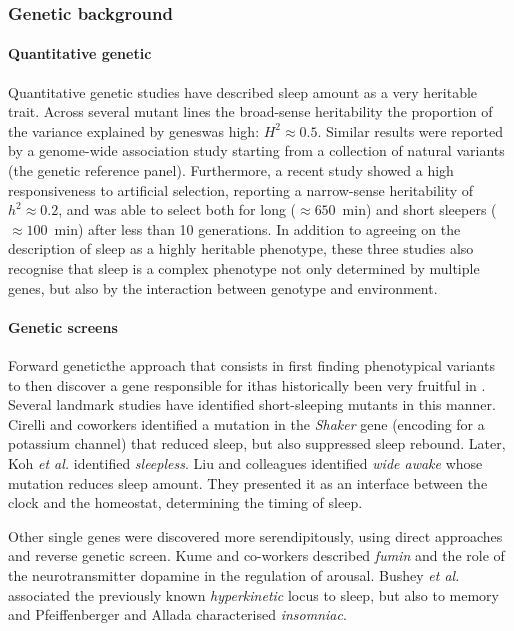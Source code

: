 \subsubsection{Genetic background}

\paragraph*{Quantitative genetic} Quantitative genetic studies have described sleep amount as a very heritable trait.
Across several mutant lines the broad-sense heritability\emd{}\ie{} the proportion of the variance explained by genes\emd{}was high: $H^2 \approx 0.5$\cite{harbison_quantitative_2008}.
Similar results were reported by a genome-wide association study starting from a collection of natural variants (the \droso{} genetic reference panel)\cite{harbison_genome-wide_2013}.
Furthermore, a recent study showed a high responsiveness to artificial selection, reporting a narrow-sense heritability of $h^2 \approx 0.2$, and was able to select both for long ($\approx 650$~min) and short sleepers ($\approx 100$~min) after less than 10 generations\cite{harbison_selection_2017}.
In addition to agreeing on the description of sleep as a highly heritable phenotype, 
these three studies also recognise that sleep is a complex phenotype not only determined by multiple genes, but also
by the interaction between genotype and environment.


\paragraph*{Genetic screens}

Forward genetic\emd{}the approach that consists in first finding phenotypical variants to then discover a gene responsible for it\emd{}has 
historically been very fruitful in \droso{}.
Several landmark studies have identified short-sleeping mutants in this manner\cite{cirelli_reduced_2005,koh_identification_2008,liu_wide_2014,pfeiffenberger_cul3_2012}.
Cirelli and coworkers identified a mutation in the \emph{Shaker} gene (encoding for a potassium channel) that reduced sleep, but also suppressed sleep rebound\cite{cirelli_reduced_2005}.
Later, Koh \emph{et al.} identified \emph{sleepless}\cite{koh_identification_2008}.
Liu and colleagues identified \emph{wide awake} whose mutation reduces sleep amount. 
They presented it as an interface between the clock and the homeostat, determining the timing of sleep\cite{liu_wide_2014}.

Other single genes were discovered more serendipitously\cite{kume_dopamine_2005}, using direct approaches\cite{bushey_drosophila_2007} and reverse genetic screen\cite{pfeiffenberger_cul3_2012}.
Kume and co-workers described \emph{fumin} and the role of the neurotransmitter dopamine in the regulation of arousal\cite{kume_dopamine_2005}.
Bushey \emph{et al.} associated the previously known \emph{hyperkinetic} locus to sleep, but also to memory\cite{bushey_drosophila_2007} and
Pfeiffenberger and Allada characterised \emph{insomniac}\cite{pfeiffenberger_cul3_2012}.




